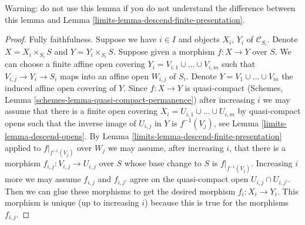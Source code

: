 Warning: do not use this lemma if you do not understand the difference
between this lemma and Lemma \ref{limits-lemma-descend-finite-presentation}.

\begin{proof}

Fully faithfulness. Suppose we have $i \in I$ and objects
$X_i$, $Y_i$ of $\mathcal{C}_{S_i}$. Denote
$X = X_i \times_{S_i} S$ and $Y = Y_i \times_{S_i} S$.
Suppose given a morphism $f : X \to Y$ over $S$.
We can choose a finite affine open covering
$Y_i = V_{i, 1} \cup \ldots \cup V_{i, m}$
such that $V_{i, j} \to Y_i \to S_i$ maps into an affine
open $W_{i, j}$ of $S_i$. Denote $Y = V_1 \cup \ldots \cup V_m$ the
induced affine open covering of $Y$.
Since $f : X \to Y$ is quasi-compact
(Schemes, Lemma \ref{schemes-lemma-quasi-compact-permanence})
after increasing $i$ we may assume that there is a
finite open covering $X_i = U_{i, 1} \cup \ldots \cup U_{i, m}$
by quasi-compact opens such that the inverse image of
$U_{i, j}$ in $Y$ is $f^{-1}(V_j)$, see
Lemma \ref{limits-lemma-descend-opens}.
By Lemma \ref{limits-lemma-descend-finite-presentation}
applied to $f|_{f^{-1}(V_j)}$ over $W_j$ we may assume, after
increasing $i$, that there is a morphism
$f_{i, j} : V_{i, j} \to U_{i, j}$ over $S$ whose base change
to $S$ is $f|_{f^{-1}(V_j)}$.
Increasing $i$ more we may assume $f_{i, j}$ and $f_{i, j'}$
agree on the quasi-compact open $U_{i, j} \cap U_{i, j'}$.
Then we can glue these morphisms to get the
desired morphism $f_i : X_i \to Y_i$.
This morphism is unique (up to increasing $i$)
because this is true for the morphisms $f_{i, j}$.


\end{proof}
